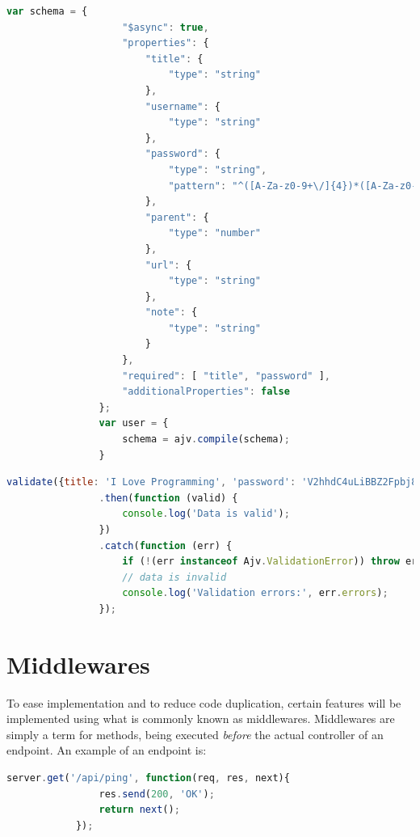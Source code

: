 			\begin{lstlisting}[gobble=16,language=JavaScript,caption={JSON schema for the password model, using ajv's notaiton.},label={lst:json:ajv:password},breakatwhitespace=false]
                var schema = {
                    "$async": true,
                    "properties": {
                        "title": {
                            "type": "string"
                        },
                        "username": {
                            "type": "string"
                        },
                        "password": {
                            "type": "string",
                            "pattern": "^([A-Za-z0-9+\/]{4})*([A-Za-z0-9+\/]{4}|[A-Za-z0-9+\/]{3}=|[A-Za-z0-9+\/]{2}==)$"
                        },
                        "parent": {
                            "type": "number"
                        },
                        "url": {
                            "type": "string"
                        },
                        "note": {
                            "type": "string"
                        }
                    },
                    "required": [ "title", "password" ],
                    "additionalProperties": false
                };
                var user = {
                    schema = ajv.compile(schema);
                }
				\end{lstlisting}

			\begin{lstlisting}[gobble=16,language=JavaScript,caption={Using the user schema for validating input, using ajv.},label={lst:json:ajv:password:use}]
                validate({title: 'I Love Programming', 'password': 'V2hhdC4uLiBBZ2Fpbj8h'))
                .then(function (valid) {
                    console.log('Data is valid');
                })
                .catch(function (err) {
                    if (!(err instanceof Ajv.ValidationError)) throw err;
                    // data is invalid
                    console.log('Validation errors:', err.errors);
                });
		\end{lstlisting}

	\section{Middlewares}
		\label{sec:impl:middleware}
		To ease implementation and to reduce code duplication, certain features will be implemented using what is commonly known as middlewares. Middlewares are simply a term for methods, being executed \emph{before} the actual controller of an endpoint. An example of an endpoint is:
		\begin{lstlisting}[gobble=12,language=JavaScript]
            server.get('/api/ping', function(req, res, next){
                res.send(200, 'OK');
                return next();
            });		
		\end{lstlisting}


